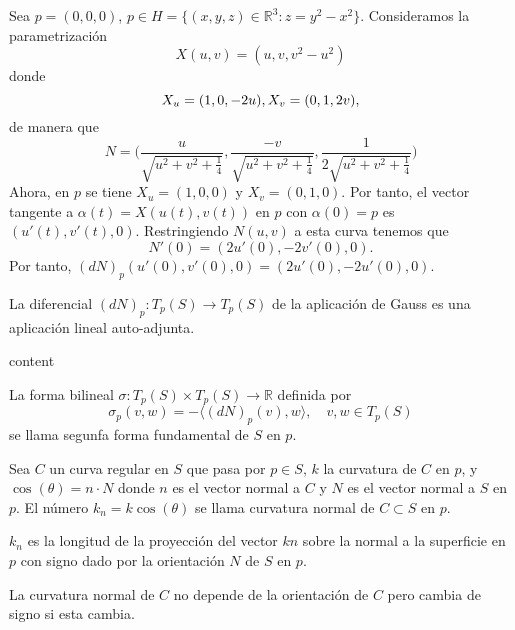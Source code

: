 \begin{ejm}
  Sea $p = (0, 0, 0)$, $p \in H = \{ (x, y, z) \in \mathbb{R}^{3} : z = y^{2} - x^{2} \}$. Consideramos la parametrización 
  \[ 
    X(u, v) = (u, v, v^{2} - u^{2})
  \] 
  donde
  \[ 
    X_{u} = (1, 0, -2u), \\
    X_{v} = (0, 1, 2v),
  \] 
  de manera que
  \[ 
    N = \Bigg ( \frac{u}{\sqrt{u^{2} + v^{2} + \frac{1}{4}}}, \frac{-v}{\sqrt{u^{2} + v^{2} + \frac{1}{4}}}, \frac{1}{2 \sqrt{u^{2} + v^{2} + \frac{1}{4}}} \Bigg ) 
  \] 
  Ahora, en $p$ se tiene $X_{u} = (1, 0, 0)$ y $X_{v} = (0, 1, 0)$. Por tanto, el vector tangente a $\alpha(t) = X(u(t),v(t))$ en $p$ con $\alpha(0) = p$ es $(u'(t), v'(t), 0)$. Restringiendo $N(u,v)$ a esta curva tenemos que
  \[ 
    N'(0) = (2u'(0), -2v'(0), 0).
  \] 
  Por tanto, $(d N)_{p}(u'(0), v'(0), 0) = (2u'(0), -2u'(0), 0)$.
\end{ejm}

\begin{prop}
  La diferencial $(d N)_{p} : T_{p}(S) \to T_{p}(S)$ de la aplicación de Gauss es una aplicación lineal auto-adjunta.
\end{prop}

\begin{dem}
  content
\end{dem}

\begin{defn}
  La forma bilineal $\sigma : T_{p}(S) \times T_{p}(S) \to \mathbb{R}$ definida por 
  \[
    \sigma_{p}(v,w) = - \langle (d N)_{p}(v){ , }w \rangle, \quad v, w \in T_{p}(S)
  \] 
  se llama segunfa forma fundamental de $S$ en $p$.
\end{defn}

\begin{defn}
  Sea $C$ un curva regular en $S$ que pasa por $p \in S$, $k$ la curvatura de $C$ en $p$, y $\cos(\theta) = n \cdot N$ donde $n$ es el vector normal a $C$ y $N$ es el vector normal a $S$ en $p$. El número $k_{n} = k \cos(\theta)$ se llama curvatura normal de $C \subset S$ en $p$.
\end{defn}

\begin{obs}
  $k_{n}$ es la longitud de la proyección del vector $kn$ sobre la normal a la superficie en $p$ con signo dado por la orientación $N$ de $S$ en $p$.
\end{obs}

\begin{obs}
  La curvatura normal de $C$ no depende de la orientación de $C$ pero cambia de signo si esta cambia.
\end{obs}

